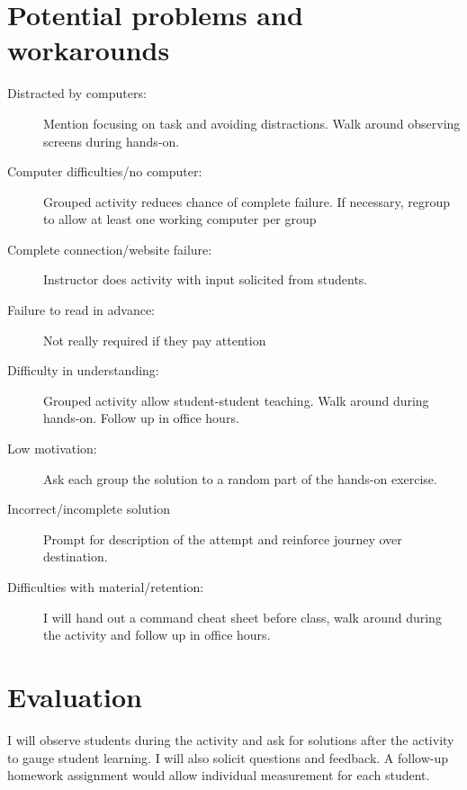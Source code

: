 \documentclass[12pt]{article}
\begin{document}
\section*{Potential problems and workarounds}
\begin{description}
  \item[Distracted by computers:]{Mention focusing on task and avoiding distractions. Walk around observing screens during hands-on.}
  \item[Computer difficulties/no computer:]{Grouped activity reduces chance of complete failure. If necessary, regroup to allow at least one working computer per group}
  \item[Complete connection/website failure:]{Instructor does activity with input solicited from students.}
  \item[Failure to read in advance:]{Not really required if they pay attention}
  \item[Difficulty in understanding:]{Grouped activity allow student-student teaching. Walk around during hands-on. Follow up in office hours.}
  \item[Low motivation:]{Ask each group the solution to a random part of the hands-on exercise.}
  \item[Incorrect/incomplete solution]{Prompt for description of the attempt and reinforce journey over destination.}
  \item[Difficulties with material/retention:]{I will hand out a command cheat sheet before class, walk around during the activity and follow up in office hours.}
\end{description}


\section*{Evaluation}
I will observe students during the activity and ask for solutions after the activity to gauge student learning. I will also solicit questions and feedback. A follow-up homework assignment would allow individual measurement for each student.
\end{document}
